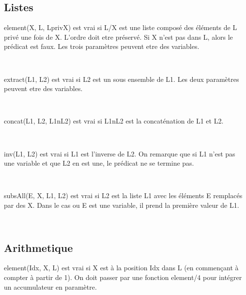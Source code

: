 \documentclass[a4paper, 11pt]{article}
\newenvironment{DDbox}[1]{
\begin{lrbox}{\BBbox}\begin{minipage}{\linewidth}}
{\end{minipage}\end{lrbox}\noindent\colorbox{Zgris}{\usebox{\BBbox}} \\
[.5cm]}
\begin{document}
\subsection{Listes}
element(X, L, LprivX) est vrai si L/X est une liste composé des
éléments de L privé une fois de X. L'ordre doit etre préservé.  Si
X n'est pas dans L, alors le prédicat est faux.  Les trois
paramètres peuvent etre des variables. \\
\begin{DDbox}{\linewidth}
    
\end{DDbox}

extract(L1, L2) est vrai si L2 est un sous ensemble de L1. Les
deux paramètres peuvent etre des variables. \\
\begin{DDbox}{\linewidth}
    
\end{DDbox}

concat(L1, L2, L1nL2) est vrai si L1nL2 est la concaténation de L1
et L2. \\
\begin{DDbox}{\linewidth}
    
\end{DDbox}

inv(L1, L2) est vrai si L1 est l'inverse de L2. On remarque que si
L1 n'est pas une variable et que L2 en est une, le prédicat ne se
termine pas. \\
\begin{DDbox}{\linewidth}
    
\end{DDbox}

subsAll(E, X, L1, L2) est vrai si L2 est la liste L1 avec les
éléments E remplacés par des X. Dans le cas ou E est une variable,
il prend la première valeur de L1. \\
\begin{DDbox}{\linewidth}
    
\end{DDbox}

%     

\subsection{Arithmetique}
element(Idx, X, L) est vrai si X est à la position Idx dans L (en
commençant à compter à partir de 1). On doit passer par une
fonction element/4 pour intégrer un accumulateur en paramètre. \\
\begin{DDbox}{\linewidth}
    
\end{DDbox}
\end{document}
